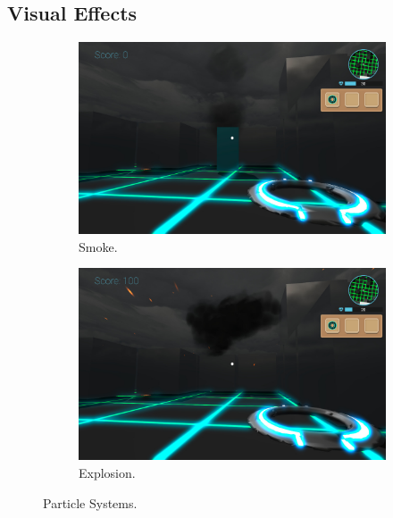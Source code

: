 \documentclass[a4paper]{article}
\begin{document}
\subsection{Visual Effects}
 \begin{figure}[H]
      \begin{subfigure}[b]{0.5\linewidth}
          \includegraphics[width=\linewidth]{ParticlesSmoke.jpg}
          \caption{Smoke.}
      \end{subfigure}
      \begin{subfigure}[b]{0.5\linewidth}
          \includegraphics[width=\linewidth]{ParticlesExplosion.jpg}
          \caption{Explosion.}
      \end{subfigure}
      \caption{Particle Systems.}
      \label{fig:particles}
  \end{figure}
  
\end{document}
